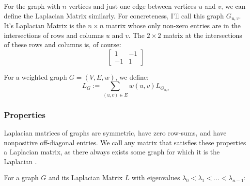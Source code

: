 For the graph with $n$ vertices and just one edge between vertices $u$ and $v$,
we can define the Laplacian Matrix similarly. For concreteness, I'll call this
graph $G_{u,v}$. It's Laplacian Matrix is the $n{\times}n$ matrix whose only
non-zero entries are in the intersections of rows and columns $u$ and $v$. The
$2{\times}2$ matrix at the intersections of these rows and columns is, of
course:
\begin{equation}
    \begin{bmatrix}
        1 & -1\\
        -1 & 1
    \end{bmatrix}
\end{equation}

For a weighted graph $G = (V,E,w)$, we define:
\begin{equation}
L_{G} := \sum_{(u,v) \in E} w(u,v)L_{G_{u,v}}
\end{equation}

\subsubsection{Properties}
\label{vectorsAndMatrices:laplacian:properties}
Laplacian matrices of graphs are symmetric, have zero row-sums, and have
nonpositive off-diagonal entries. We call any matrix that satisfies these
properties a Laplacian matrix, as there always exists some graph for which it is
the Laplacian \cite{Spielman:2010}.

For a graph $G$ and its Laplacian Matrix $L$ with eigenvalues $\lambda_{0} <
\lambda_{1} < \ldots < \lambda_{n-1}$:

